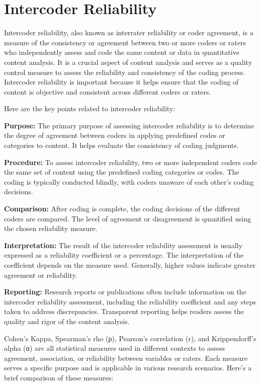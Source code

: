 \documentclass[
  b5paper]{book}
\begin{document}
\hypertarget{intercoder-reliability}{%
\section{Intercoder Reliability}\label{intercoder-reliability}}

Intercoder reliability, also known as interrater reliability or coder agreement, is a measure of the consistency or agreement between two or more coders or raters who independently assess and code the same content or data in quantitative content analysis. It is a crucial aspect of content analysis and serves as a quality control measure to assess the reliability and consistency of the coding process. Intercoder reliability is important because it helps ensure that the coding of content is objective and consistent across different coders or raters.

Here are the key points related to intercoder reliability:

\textbf{Purpose:} The primary purpose of assessing intercoder reliability is to determine the degree of agreement between coders in applying predefined codes or categories to content. It helps evaluate the consistency of coding judgments.

\textbf{Procedure:} To assess intercoder reliability, two or more independent coders code the same set of content using the predefined coding categories or codes. The coding is typically conducted blindly, with coders unaware of each other's coding decisions.

\textbf{Comparison:} After coding is complete, the coding decisions of the different coders are compared. The level of agreement or disagreement is quantified using the chosen reliability measure.

\textbf{Interpretation:} The result of the intercoder reliability assessment is usually expressed as a reliability coefficient or a percentage. The interpretation of the coefficient depends on the measure used. Generally, higher values indicate greater agreement or reliability.

\textbf{Reporting:} Research reports or publications often include information on the intercoder reliability assessment, including the reliability coefficient and any steps taken to address discrepancies. Transparent reporting helps readers assess the quality and rigor of the content analysis.

Cohen's Kappa, Spearman's rho (ρ), Pearson's correlation (r), and Krippendorff's alpha (α) are all statistical measures used in different contexts to assess agreement, association, or reliability between variables or raters. Each measure serves a specific purpose and is applicable in various research scenarios. Here's a brief comparison of these measures:
\end{document}

